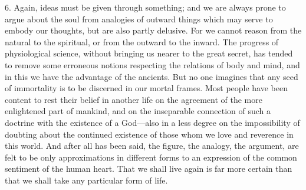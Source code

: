 \documentclass[11pt,letter]{article}
\begin{document}
\par  6. Again, ideas must be given through something; and we are always prone to argue about the soul from analogies of outward things which may serve to embody our thoughts, but are also partly delusive. For we cannot reason from the natural to the spiritual, or from the outward to the inward. The progress of physiological science, without bringing us nearer to the great secret, has tended to remove some erroneous notions respecting the relations of body and mind, and in this we have the advantage of the ancients. But no one imagines that any seed of immortality is to be discerned in our mortal frames. Most people have been content to rest their belief in another life on the agreement of the more enlightened part of mankind, and on the inseparable connection of such a doctrine with the existence of a God—also in a less degree on the impossibility of doubting about the continued existence of those whom we love and reverence in this world. And after all has been said, the figure, the analogy, the argument, are felt to be only approximations in different forms to an expression of the common sentiment of the human heart. That we shall live again is far more certain than that we shall take any particular form of life.
\end{document}
